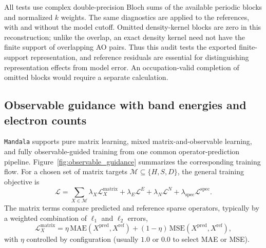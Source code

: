 \documentclass[preprint,12pt,compress,numafflabel]{elsarticle}
\newcommand{\Loss}{\mathcal{L}}
\begin{document}
All tests use complex double-precision Bloch sums of the available periodic blocks and normalized $k$ weights. The same diagnostics are applied to the references, with and without the model cutoff. Omitted density-kernel blocks are zero in this reconstruction; unlike the overlap, an exact density kernel need not have the finite support of overlapping AO pairs. Thus this audit tests the exported finite-support representation, and reference residuals are essential for distinguishing representation effects from model error. An occupation-valid completion of omitted blocks would require a separate calculation.


\subsection{Observable guidance with band energies and electron counts}
\label{subsec:training_objectives}

\texttt{Mandala} supports pure matrix learning, mixed matrix-and-observable learning, and fully observable-guided training from one common operator-prediction pipeline.
Figure~\ref{fig:observable_guidance} summarizes the corresponding training flow.
For a chosen set of matrix targets $\mathcal{M} \subseteq \{H,S,D\}$, the general training objective is
\begin{equation}
\Loss
=
\sum_{X \in \mathcal{M}} \lambda_X \Loss_X^{\mathrm{matrix}}
+ \lambda_E \Loss^{E}
+ \lambda_N \Loss^{N}
+ \lambda_{\mathrm{spec}}\Loss^{\mathrm{spec}}.
\end{equation}
The matrix terms compare predicted and reference sparse operators, typically by a weighted combination of $\ell_1$ and $\ell_2$ errors,
\begin{equation}
\Loss_X^{\mathrm{matrix}}
=
\eta \, \mathrm{MAE}(X^{\mathrm{pred}},X^{\mathrm{ref}})
+ (1-\eta)\, \mathrm{MSE}(X^{\mathrm{pred}},X^{\mathrm{ref}}),
\end{equation}
with $\eta$ controlled by configuration (usually $1.0$ or $0.0$ to select MAE or MSE).
\end{document}
